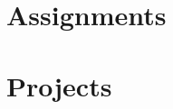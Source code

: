 \documentclass[12pt,oneside]{book}
\theoremstyle{definition}
\begin{document}
\tableofcontents
\part{Assignments}






\part{Projects}

\end{document}
